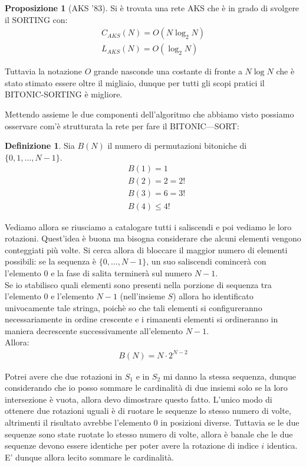 \documentclass[a4paper,portrait,12pt]{article}
\theoremstyle{definition}
\newtheorem{definition}{Definizione}[section]
\newtheorem{proposition}{Proposizione}
\begin{document}
\begin{proposition}[AKS '83]
Si è trovata una rete AKS che è in grado di svolgere il SORTING con:
\begin{gather*}
C_{AKS}(N) = O(N \log_2 N)\\
L_{AKS}(N) = O(\log_2 N)
\end{gather*}
\end{proposition}

Tuttavia la notazione $O$ grande nasconde una costante di fronte a $N \log N$ che è stato stimato essere oltre il migliaio, dunque per tutti gli scopi pratici il BITONIC-SORTING è migliore.

Mettendo assieme le due componenti dell’algoritmo che abbiamo visto possiamo osservare com’è strutturata la rete per fare il BITONIC—SORT:\\

\begin{definition}
Sia $B(N)$ il numero di permutazioni bitoniche di $\{0,1,...,N-1\}$.
\begin{align*}
&B(1) = 1\\
&B(2) = 2 = 2!\\
&B(3) = 6 = 3!\\
&B(4) \le 4!
\end{align*}
\end{definition}

Vediamo allora se riusciamo a catalogare tutti i saliscendi e poi vediamo le loro rotazioni.
Quest’idea è buona ma bisogna considerare che alcuni elementi vengono conteggiati più volte.
Si cerca allora di bloccare il maggior numero di elementi possibili: se la sequenza è $\{0,...,N-1\}$, un suo saliscendi comincerà con l’elemento $0$ e la fase di salita terminerà sul numero $N-1$.\\

Se io stabilisco quali elementi sono presenti nella porzione di sequenza tra l’elemento $0$ e l’elemento $N-1$ (nell’insieme $S$) allora ho identificato univocamente tale stringa, poichè so che tali elementi si configureranno necessariamente in ordine crescente e i rimanenti elementi si ordineranno in maniera decrescente successivamente all’elemento $N-1$.\\
Allora:
\begin{gather*}
B(N) = N \cdot 2^{N-2}
\end{gather*}

Potrei avere che due rotazioni in $S_1$ e in $S_2$ mi danno la stessa sequenza, dunque considerando che io posso sommare le cardinalità di due insiemi solo se la loro intersezione è vuota, allora devo dimostrare questo fatto.
L’unico modo di ottenere due rotazioni uguali è di ruotare le sequenze lo stesso numero di volte, altrimenti il risultato avrebbe l’elemento $0$ in posizioni diverse.
Tuttavia se le due sequenze sono state ruotate lo stesso numero di volte, allora è banale che le due sequenze devono essere identiche per poter avere la rotazione di indice $i$ identica.
E’ dunque allora lecito sommare le cardinalità.\\
\end{document}
